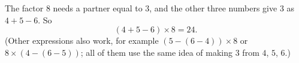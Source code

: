 The factor $8$ needs a partner equal to $3$, and the other three numbers give $3$ as $4+5-6$. So
\[
\boxed{(4+5-6)\times8=24}.
\]
(Other expressions also work, for example $(5-(6-4))\times8$ or $8\times(4-(6-5))$; all of them use the same idea of making $3$ from $4$, $5$, $6$.)
